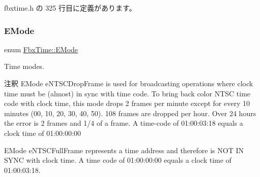  fbxtime.\+h の 325 行目に定義があります。

\mbox{\label{class_fbx_time_acc529b00a0e8d4c3da3702449ca93031}} 
\subsubsection{\texorpdfstring{E\+Mode}{EMode}}
{\footnotesize\ttfamily enum \hyperlink{class_fbx_time_acc529b00a0e8d4c3da3702449ca93031}{Fbx\+Time\+::\+E\+Mode}}

Time modes. \begin{DoxyRemark}{注釈}
E\+Mode {\ttfamily e\+N\+T\+S\+C\+Drop\+Frame} is used for broadcasting operations where clock time must be (almost) in sync with time code. To bring back color N\+T\+SC time code with clock time, this mode drops 2 frames per minute except for every 10 minutes (00, 10, 20, 30, 40, 50). 108 frames are dropped per hour. Over 24 hours the error is 2 frames and 1/4 of a frame. A time-\/code of 01\+:00\+:03\+:18 equals a clock time of 01\+:00\+:00\+:00
\end{DoxyRemark}
\begin{DoxyParagraph}{}
E\+Mode {\ttfamily e\+N\+T\+S\+C\+Full\+Frame} represents a time address and therefore is N\+OT IN S\+Y\+NC with clock time. A time code of 01\+:00\+:00\+:00 equals a clock time of 01\+:00\+:03\+:18.
\end{DoxyParagraph}

